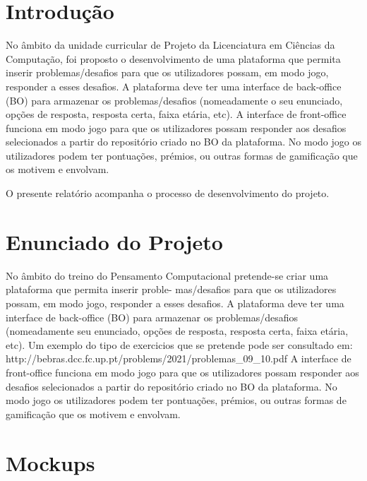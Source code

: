 \documentclass[11pt,a4paper]{report}
\begin{document}
\tableofcontents %

\chapter{Introdução}

No âmbito da unidade curricular de Projeto da Licenciatura em Ciências da Computação, foi proposto o desenvolvimento de uma plataforma que permita inserir problemas/desafios para que os utilizadores possam, em modo jogo, responder a esses desafios. A plataforma deve ter uma interface de back-office (BO) para armazenar os problemas/desafios (nomeadamente o seu enunciado, opções de resposta, resposta certa, faixa etária, etc). 
A interface de front-office funciona em modo jogo para que os utilizadores possam responder aos desafios selecionados a partir do repositório criado no BO da plataforma. No modo jogo os utilizadores podem ter pontuações, prémios, ou outras formas de gamificação que os motivem e envolvam. \par
O presente relatório acompanha o processo de desenvolvimento do projeto.



\chapter{Enunciado do Projeto}

No âmbito do treino do Pensamento Computacional pretende-se criar uma plataforma que permita inserir proble-
mas/desafios para que os utilizadores possam, em modo jogo, responder a esses desafios. A plataforma deve ter
uma interface de back-office (BO) para armazenar os problemas/desafios (nomeadamente seu enunciado, opções de
resposta, resposta certa, faixa etária, etc). Um exemplo do tipo de exercicios que se pretende pode ser consultado
em: http://bebras.dcc.fc.up.pt/problems/2021/problemas\_09\_10.pdf
A interface de front-office funciona em modo jogo para que os utilizadores possam responder aos desafios
selecionados a partir do repositório criado no BO da plataforma. No modo jogo os utilizadores podem ter pontuações,
prémios, ou outras formas de gamificação que os motivem e envolvam.

\chapter{Mockups}
\end{document}
